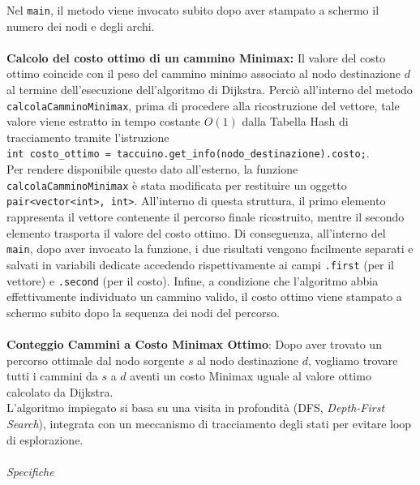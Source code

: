 \documentclass[12pt, a4paper]{article}
\begin{document}
Nel \texttt{main}, il metodo viene invocato subito dopo aver stampato a schermo il numero dei nodi e degli archi. \\ \\
{\large\textbf{Calcolo del costo ottimo di un cammino Minimax:}} Il valore del costo ottimo coincide con il peso del cammino minimo associato al nodo destinazione $d$ al termine dell'esecuzione dell'algoritmo di Dijkstra. Perciò all'interno del metodo \texttt{calcolaCamminoMinimax}, prima di procedere alla ricostruzione del vettore, tale valore viene estratto in tempo costante $O(1)$ dalla Tabella Hash di tracciamento tramite l'istruzione \\
\texttt{int costo\_ottimo = taccuino.get\_info(nodo\_destinazione).costo;}. \\
Per rendere disponibile questo dato all'esterno, la funzione \texttt{calcolaCamminoMinimax} è stata modificata per restituire un oggetto \texttt{pair<vector<int>, int>}. All'interno di questa struttura, il primo elemento rappresenta il vettore contenente il percorso finale ricostruito, mentre il secondo elemento trasporta il valore del costo ottimo. Di conseguenza, all'interno del \texttt{main}, dopo aver invocato la funzione, i due risultati vengono facilmente separati e salvati in variabili dedicate accedendo rispettivamente ai campi \texttt{.first} (per il vettore) e \texttt{.second} (per il costo). Infine, a condizione che l'algoritmo abbia effettivamente individuato un cammino valido, il costo ottimo viene stampato a schermo subito dopo la sequenza dei nodi del percorso.\\ \\
{\large\textbf{Conteggio Cammini a Costo Minimax Ottimo}}: Dopo aver trovato un percorso ottimale dal nodo sorgente $s$ al nodo destinazione $d$, vogliamo trovare tutti i cammini da $s$ a $d$ aventi un costo Minimax uguale al valore ottimo calcolato da Dijkstra. \\ 
L'algoritmo impiegato si basa su una visita in profondità (DFS, \textit{Depth-First Search}), integrata con un meccanismo di tracciamento degli stati per evitare loop di esplorazione. \\ \\
{\large \textit{Specifiche}}
\end{document}
